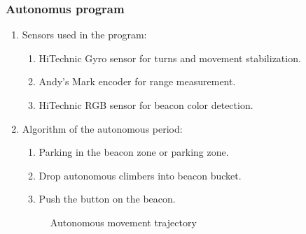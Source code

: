\subsubsection{Autonomus program}
 
    \begin{enumerate} 
      
      \item Sensors used in the program:
      \begin{enumerate}
      	\item HiTechnic Gyro sensor for turns and movement stabilization.
      	\item Andy's Mark encoder for range measurement.
      	\item HiTechnic RGB sensor for beacon color detection.
      \end{enumerate}
      	 
      \item Algorithm of the autonomous period:
      \begin{enumerate}
        \item Parking in the beacon zone or parking zone.
        \item Drop autonomous climbers into beacon bucket.
        \item Push the button on the beacon.
      \end{enumerate}
      
      \begin{figure}[H]
  		\caption{Autonomous movement trajectory}
  	  \end{figure}
  	  
    \end{enumerate}  
\fillpage